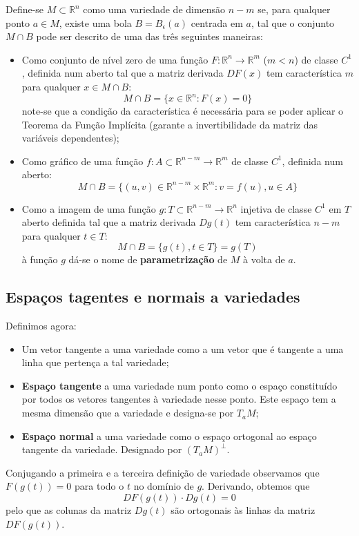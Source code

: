 \documentclass{article}
\newcommand{\R}{\mathbb{R}}
\begin{document}
Define-se $M \subset \R^n$ como uma variedade de dimensão $n-m$ se, para qualquer ponto $a \in M$, existe uma bola $B = B_\epsilon(a)$ centrada em $a$, tal que o conjunto $M \cap B$ pode ser descrito de uma das três seguintes maneiras:
\begin{itemize}
    \item Como conjunto de nível zero de uma função $F: \R^n \to \R^m$ ($m<n$) de classe $C^1$, definida num aberto tal que a matriz derivada $DF(x)$ tem característica $m$ para qualquer $x \in M \cap B$:
$$ M \cap B = \{ x \in \R^n: F(x) = 0 \} $$
note-se que a condição da característica é necessária para se poder aplicar o Teorema da Função Implícita (garante a invertibilidade da matriz das variáveis dependentes);
    \item Como gráfico de uma função $f: A \subset \R^{n-m} \to \R^m$ de classe $C^1$, definida num aberto:
$$ M \cap B = \{ (u,v) \in \R^{n-m} \times \R^m: v=f(u), u \in A \} $$
    \item Como a imagem de uma função $g: T \subset \R^{n-m} \to \R^n$ injetiva de classe $C^1$ em $T$ aberto definida tal que a matriz derivada $Dg(t)$ tem característica $n-m$ para qualquer $t \in T$:
$$ M \cap B = \{ g(t), t \in T \} = g(T) $$
à função $g$ dá-se o nome de \textbf{parametrização} de $M$ à volta de $a$.
\end{itemize}

\subsection{Espaços tagentes e normais a variedades}
Definimos agora:
\begin{itemize}
    \item Um vetor tangente a uma variedade como a um vetor que é tangente a uma linha que pertença a tal variedade;
    \item \textbf{Espaço tangente} a uma variedade num ponto como o espaço constituído por todos os vetores tangentes à variedade nesse ponto. Este espaço tem a mesma dimensão que a variedade e designa-se por $T_aM$;
    \item \textbf{Espaço normal} a uma variedade como o espaço ortogonal ao espaço tangente da variedade. Designado por $(T_aM)^\perp$.
\end{itemize}
Conjugando a primeira e a terceira definição de variedade observamos que $F(g(t))=0$ para todo o $t$ no domínio de $g$. Derivando, obtemos que
$$ DF(g(t)) \cdot Dg(t) = 0 $$
pelo que as colunas da matriz $Dg(t)$ são ortogonais às linhas da matriz $DF(g(t))$. 
\end{document}
